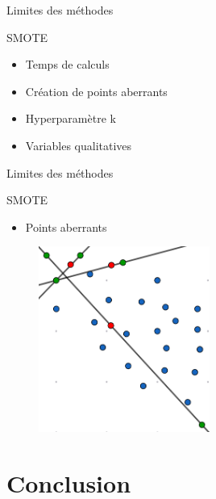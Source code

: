 \documentclass{beamer}
\begin{document}
\begin{frame}{Limites des méthodes}
\begin{block}{SMOTE}
    \begin{itemize}
    \item Temps de calculs
     \item Création de points aberrants
     \item Hyperparamètre k
     \item Variables qualitatives
     \end{itemize}
\end{block}

\end{frame}

\begin{frame}{Limites des méthodes}
\begin{block}{SMOTE}
    \begin{itemize}
       \item Points aberrants
   \end{itemize}
\end{block}

    \begin{figure}
    \centering
    \includegraphics[width=0.5\textwidth]{images/lsmote.png}

\end{figure}
\end{frame}

\section{Conclusion}
\end{document}
